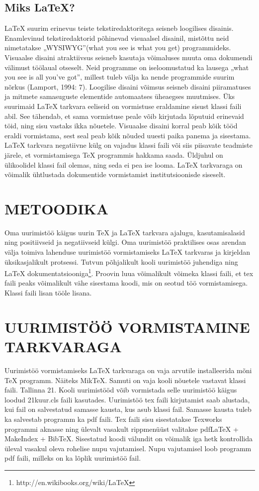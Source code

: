 \documentclass{21kuur}
\begin{document}
\section{Miks LaTeX?}
LaTeX suurim erinevus teiste tekstiredaktoritega seisneb loogilises disainis. Enamlevinud tekstiredaktorid põhinevad visuaalsel disainil, mistõttu neid nimetatakse „WYSIWYG”(what you see is what you get) programmideks. Visuaalse disaini atraktiivsus seisneb kasutaja võimaluses muuta oma dokumendi välimust töölaual otseselt. Neid programme on iseloomustatud ka lausega „what you see is all you've got”, millest tuleb välja ka nende programmide suurim nõrkus (Lamport, 1994: 7). Loogilise disaini võimsus seisneb disaini piiramatuses ja mitmete samasuguste elementide automaatses üheaegses muutmises. Üks suurimaid LaTeX tarkvara eeliseid on vormistuse eraldamine sisust klassi faili abil. See tähendab, et sama vormistuse peale võib kirjutada lõputuid erinevaid töid, ning sisu vastaks ikka nõuetele. Visuaalse disaini korral peab kõik tööd eraldi vormistama, sest seal peab kõik nõuded uuesti paika panema ja sisestama. LaTeX tarkvara negatiivne külg on vajadus klassi faili või siis piisavate teadmiste järele, et vormistamisega TeX programmis hakkama saada. Üldjuhul on ülikoolidel klassi fail olemas, ning seda ei pea ise looma. LaTeX tarkvaraga on võimalik ühtlustada dokumentide vormistamist institutsioonisde siseselt.

\chapter{METOODIKA}
Oma uurimistöö käigus uurin TeX ja LaTeX tarkvara ajalugu, kasutamisalasid ning positiivseid ja negatiivseid külgi. Oma uurimistöö praktilises osas arendan välja toimiva lahenduse uurimistöö vormistamiseks LaTeX tarkvaras ja kirjeldan üksikasjalikult protsessi. Tutvun põhjalikult kooli uurimistöö juhendiga ning LaTeX dokumentatsiooniga\footnote{http://en.wikibooks.org/wiki/LaTeX}. Proovin luua võimalikult võimeka klassi faili, et tex faili peaks võimalikult vähe sisestama koodi, mis on seotud töö vormistamisega. Klassi faili lisan tööle lisana.

\chapter{UURIMISTÖÖ VORMISTAMINE \latex TARKVARAGA}
Uurimistöö vormistamiseks LaTeX tarkvaraga on vaja arvutile installeerida mõni TeX programm. Näiteks MikTeX. Samuti on vaja kooli nõuetele vastavat klassi faili. Tallinna 21. Kooli uurimistööd võib vormistada selle uurimistöö käigus loodud 21kuur.cls faili kasutades. Uurimistöö tex faili kirjutamist saab alustada, kui fail on salvestatud samasse kausta, kus asub klassi fail. Samasse kausta tuleb ka salvestab programm ka pdf faili. Tex faili sisu sisestatakse Texworks programmi aknasse ning ülevalt vasakult rippmenüüst valitakse pdfLaTeX + MakeIndex + BibTeX. Sisestatud koodi välundit on võimalik iga hetk kontrollida üleval vasakul oleva rohelise nupu vajutamisel. Nupu vajutamisel loob programm pdf faili, milleks on ka lõplik uurimistöö fail.
\end{document}
